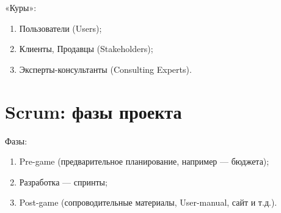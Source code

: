 \documentclass{article}
\let\stdsection\section
\renewcommand\section{\newpage\stdsection}
\begin{document}
    «Куры»:
    \begin{enumerate}
        \item Пользователи (Users);
        \item Клиенты, Продавцы (Stakeholders);
        \item Эксперты-консультанты (Consulting Experts).
    \end{enumerate}

\section{Scrum: фазы проекта}
    Фазы:
    \begin{enumerate}
        \item Pre-game (предварительное планирование, например — бюджета);
        \item Разработка — спринты;
        \item Post-game (сопроводительные материалы, User-manual, сайт и т.д.).
    \end{enumerate}
\end{document}
